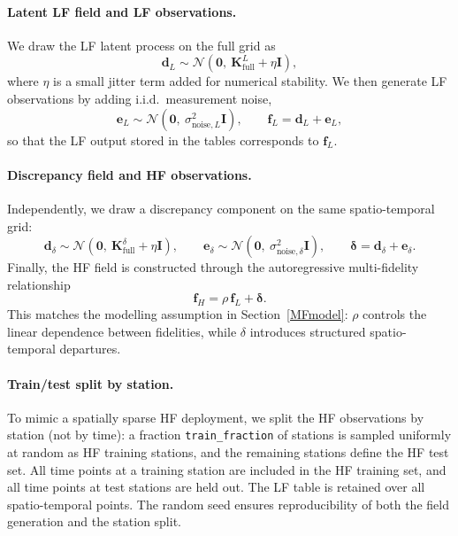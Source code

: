 \documentclass[12pt]{article}
\begin{document}
\paragraph{Latent LF field and LF observations.}
We draw the LF latent process on the full grid as
\begin{equation}
\bm{d}_L \sim \mathcal{N}\!\left(\bm{0},\ \bm{K}^{L}_{\text{full}} + \eta\bm{I}\right),
\end{equation}
where $\eta$ is a small jitter term added for numerical stability.
We then generate LF observations by adding i.i.d.\ measurement noise,
\begin{equation}
\bm{e}_L \sim \mathcal{N}\!\left(\bm{0},\ \sigma^2_{\text{noise},L}\bm{I}\right),
\qquad
\bm{f}_L = \bm{d}_L + \bm{e}_L,
\end{equation}
so that the LF output stored in the tables corresponds to $\bm{f}_L$.

\paragraph{Discrepancy field and HF observations.}
Independently, we draw a discrepancy component on the same spatio-temporal grid:
\begin{equation}
\bm{d}_\delta \sim \mathcal{N}\!\left(\bm{0},\ \bm{K}^{\delta}_{\text{full}} + \eta\bm{I}\right),
\qquad
\bm{e}_\delta \sim \mathcal{N}\!\left(\bm{0},\ \sigma^2_{\text{noise},\delta}\bm{I}\right),
\qquad
\bm{\delta}=\bm{d}_\delta+\bm{e}_\delta.
\end{equation}
Finally, the HF field is constructed through the autoregressive multi-fidelity relationship
\begin{equation}\label{eq:sim_hf}
\bm{f}_H = \rho\,\bm{f}_L + \bm{\delta}.
\end{equation}
This matches the modelling assumption in Section~\ref{MFmodel}: $\rho$ controls the linear
dependence between fidelities, while $\delta$ introduces structured spatio-temporal departures.

\paragraph{Train/test split by station.}
To mimic a spatially sparse HF deployment, we split the HF observations by station (not by time):
a fraction \texttt{train\_fraction} of stations is sampled uniformly at random as HF training stations,
and the remaining stations define the HF test set. All time points at a training station are included
in the HF training set, and all time points at test stations are held out. The LF table is retained over
all spatio-temporal points.
The random seed ensures reproducibility of both the field generation and the station split.
\end{document}
